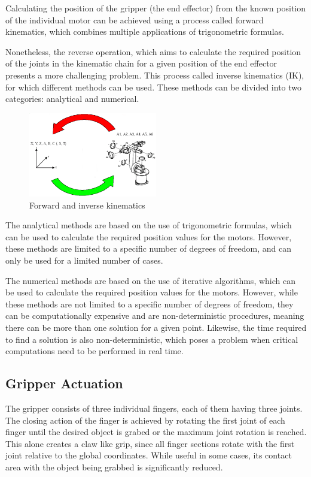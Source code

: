 Calculating the position of the gripper (the end effector) from the known position of the individual motor can be achieved using a process called forward kinematics, which combines multiple applications of trigonometric formulas.

Nonetheless, the reverse operation, which aims to calculate the required position of the joints in the kinematic chain for a given position of the end effector presents a more challenging problem. 
This process called inverse kinematics (IK), for which different methods can be used. These methods can be divided into two categories: analytical and numerical.

\begin{figure}[!h]
    \centering
    \includegraphics[width=0.5\textwidth]{Figures/fk_vs_ik.png}
    \caption{Forward and inverse kinematics}
    \label{fig:fkik}
\end{figure}

The analytical methods are based on the use of trigonometric formulas, which can be used to calculate the required position values for the motors. However, these methods are limited to a specific number of degrees of freedom, and can only be used for a limited number of cases.

The numerical methods are based on the use of iterative algorithms, which can be used to calculate the required position values for the motors. However, while these methods are not limited to a specific number of degrees of freedom, they can be computationally expensive and are non-deterministic procedures, meaning there can be more than one solution for a given point. Likewise, the time required to find a solution is also non-deterministic, which poses a problem when critical computations need to be performed in real time.


\subsection{Gripper Actuation}

The gripper consists of three individual fingers, each of them having three joints. The closing action of the finger is achieved by rotating the first joint of each finger until the desired object is grabed or the maximum joint rotation is reached. This alone creates a claw like grip, since all finger sections rotate with the first joint relative to the global coordinates. While useful in some cases, its contact area with the object being grabbed is significantly reduced.

